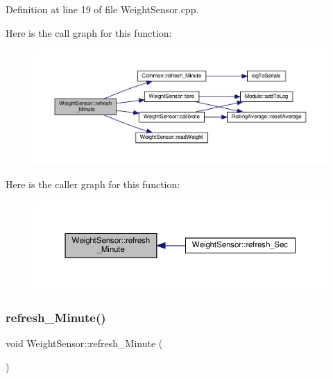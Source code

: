 Definition at line 19 of file Weight\+Sensor.\+cpp.

Here is the call graph for this function\+:
\nopagebreak
\begin{figure}[H]
\begin{center}
\leavevmode
\includegraphics[width=350pt]{class_weight_sensor_a3d0d70823fc37a32d8320189d15d448d_cgraph}
\end{center}
\end{figure}
Here is the caller graph for this function\+:
\nopagebreak
\begin{figure}[H]
\begin{center}
\leavevmode
\includegraphics[width=350pt]{class_weight_sensor_a3d0d70823fc37a32d8320189d15d448d_icgraph}
\end{center}
\end{figure}
\mbox{\label{class_weight_sensor_a3d0d70823fc37a32d8320189d15d448d}} 
\subsubsection{\texorpdfstring{refresh\+\_\+\+Minute()}{refresh\_Minute()}\hspace{0.1cm}{\footnotesize\ttfamily [2/2]}}
{\footnotesize\ttfamily void Weight\+Sensor\+::refresh\+\_\+\+Minute (\begin{DoxyParamCaption}{ }\end{DoxyParamCaption})\hspace{0.3cm}{\ttfamily [virtual]}}



